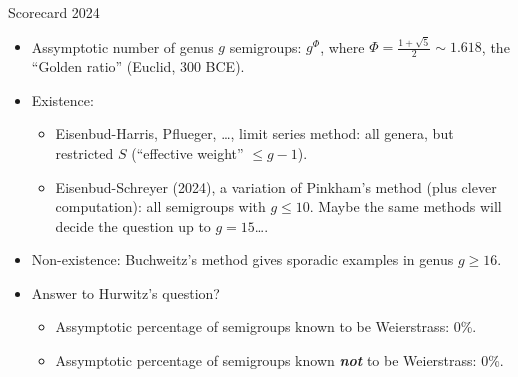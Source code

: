 \documentclass[12pt, aspectratio=169]{beamer}
\begin{document}
\begin{frame}{Scorecard 2024}\
\begin{itemize}
\item<1-> Assymptotic number of genus $g$ semigroups: $g^\Phi$, where $\Phi = \frac{1+\sqrt 5}{2}\sim 1.618$, the ``Golden ratio'' (Euclid, 300 BCE).
 \item<2-> Existence: 
\begin{itemize}
  \item<3-> Eisenbud-Harris, Pflueger, \dots, limit series method: all genera, but restricted $S$ (``effective weight'' $\leq g-1$).
\item<3-> Eisenbud-Schreyer (2024), a variation of Pinkham's method (plus clever computation): all semigroups with $g\leq 10$. Maybe the same methods will decide the question up to $g =15$\dots .
\end{itemize}
\item<4-> Non-existence: Buchweitz's method gives sporadic examples in genus $g \geq 16$.
\item<5-> Answer to Hurwitz's question?
\begin{itemize}
  \item<6-> \alert{Assymptotic percentage of semigroups  known to be Weierstrass: 0\%.}
 \item<7-> \alert{Assymptotic percentage of semigroups  known {\it\bf not} to be Weierstrass: 0\%.}
\end{itemize}
 \end{itemize}
\end{frame}
\end{document}

